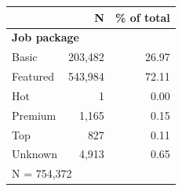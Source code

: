 \begin{tabular}{lrr}


\toprule


 & N & \% of total \\


\midrule


\multicolumn{3}{l}{\textbf{Job package}}\\ 
\midrule
Basic               &     203,482&       26.97\\
Featured            &     543,984&       72.11\\
Hot                 &           1&        0.00\\
Premium             &       1,165&        0.15\\
Top                 &         827&        0.11\\
Unknown             &       4,913&        0.65\\
\midrule


\multicolumn{3}{l}{\footnotesize N =      754,372}\\


\bottomrule


\end{tabular}


